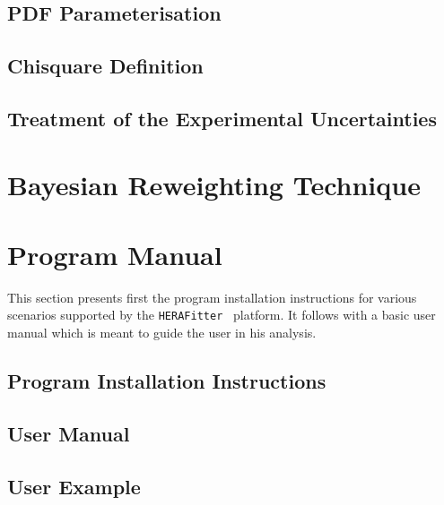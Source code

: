 \documentclass[11pt,twoside,a4paper]{article}
\newcommand\fitter{ \mbox{\tt HERAFitter} }
\begin{document}
\subsection{PDF Parameterisation}


\subsection{Chisquare  Definition}


\subsection{Treatment of the Experimental Uncertainties}
\label{sec:error}


\section{Bayesian Reweighting Technique}
\label{sec:reweighting}
 



\newpage
\section{Program Manual}
\label{sec:progman}
This section presents first the program installation instructions for various scenarios supported by the \fitter\ platform. It follows with a basic user manual which is meant to guide the user in his analysis. 
\subsection{Program Installation Instructions} 

\subsection{User Manual}

\subsection{User Example}



\appendix
%
\end{document}
